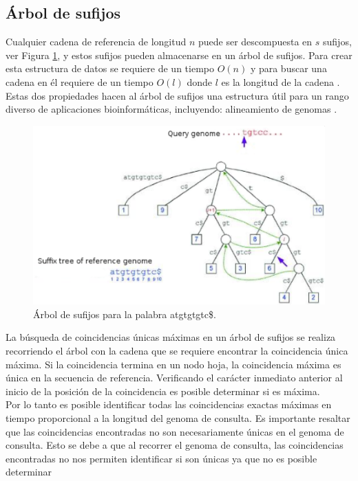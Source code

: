 \documentclass[12pt,a4paper]{article}
\begin{document}
\subsection{Árbol de sufijos}
\indent
 Cualquier cadena de referencia de longitud $n$ puede ser descompuesta en $s$ sufijos, ver
 Figura \ref{fig:st}, y estos sufijos pueden almacenarse en un árbol de sufijos.
 Para crear esta estructura de datos se requiere de un tiempo $O(n)$ y para
 buscar una cadena en él requiere de un tiempo $O(l)$ donde $l$ es la longitud
 de la cadena \cite{Gusfield2007Algorithms}. Estas dos propiedades hacen al árbol
 de sufijos una estructura útil para un rango diverso de aplicaciones
 bioinformáticas, incluyendo: alineamiento de genomas \cite{Mummer3}.\\
   \begin{figure}[h] 
   \centering 
   \includegraphics[scale=0.8]{st-mum.eps} 
   \caption{Árbol de sufijos para la palabra atgtgtgtc\$.} 
   \label{fig:st} 
 \end{figure}
\indent
La búsqueda de coincidencias únicas máximas en un árbol de sufijos se realiza recorriendo el árbol
con la cadena que se requiere encontrar la coincidencia única máxima. Si la coincidencia termina en 
un nodo hoja, la coincidencia máxima es única en la secuencia de referencia. Verificando el 
carácter inmediato anterior al inicio de la posición de la coincidencia es posible determinar si es
máxima.\\
\indent
Por lo tanto es posible identificar todas las coincidencias exactas máximas en tiempo proporcional a
la longitud del genoma de consulta. Es importante resaltar que las coincidencias encontradas no son
necesariamente únicas en el genoma de consulta. Esto se debe a que al recorrer el genoma de consulta, 
las coincidencias encontradas no nos permiten identificar si son únicas ya que no es posible determinar
\end{document}
